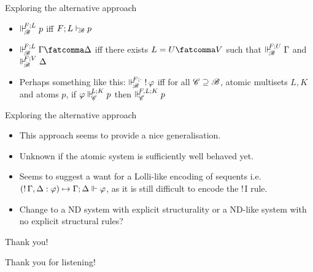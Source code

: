 \documentclass{beamer}
\begin{document}
\begin{frame}{Exploring the alternative approach}
\begin{itemize}
\item $\Vdash_{ \!\!\mathscr{B} }^{ \!\!F;L }p$ iff $F;L\vdash_{\!\!\mathscr{B}}p$
\vspace{0.3cm}
\item $\suppM{\baseB}{F;L}\Gamma\fatcomma\Delta$ iff there exists $L=U\fatcomma V$ such that $\Vdash_{ \!\!\mathscr{B} }^{ \!\!F;U }\Gamma$ and $\Vdash_{ \!\!\mathscr{B} }^{ \!\!F;V }\Delta$
\pause
\vspace{0.3cm}
\item Perhaps something like this: \newline
$\Vdash_{ \!\!\mathscr{B} }^{ \!\!F;\cdot }\mathop{!} \varphi$ iff for all $\mathscr{C} \supseteq \mathscr{B}$, atomic multisets $L,K$ and atoms $p$, if $\varphi\Vdash_{ \!\!\mathscr{C} }^{ \!\!L;K }p$ then $\Vdash_{ \!\!\mathscr{C} }^{ \!\!F,L;K }p$ 
\end{itemize}
\end{frame}
\begin{frame}{Exploring the alternative approach}
\begin{itemize}
\item This approach seems to provide a nice generalisation.
\vspace{0.3cm}
\item Unknown if the atomic system is sufficiently well behaved yet.
\vspace{0.3cm}
\item Seems to suggest a want for a Lolli-like encoding of sequents i.e. $(\mathop{!} \Gamma, \Delta: \varphi) \mapsto \Gamma;\Delta \Vdash \varphi$, as it is still difficult to encode the $\mathop{!}$I rule.
\vspace{0.3cm}
\item Change to a ND system with explicit structurality or a ND-like system with no explicit structural rules?
\end{itemize}
\end{frame}
\begin{frame}{Thank you!}
\begin{center}
Thank you for listening!
\end{center}
\end{frame}
\end{document}
